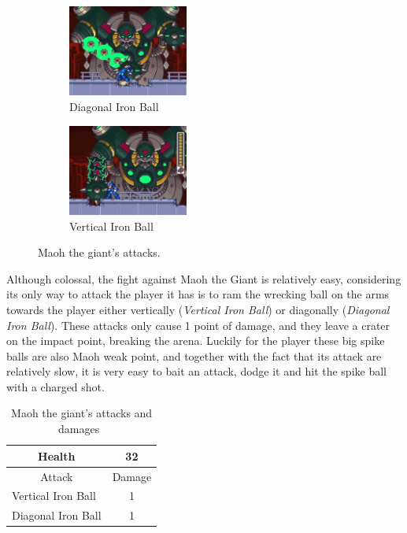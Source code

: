\begin{figure}[htp]
\centering
\begin{subfigure}{0.4\linewidth}
	\centering
	\includegraphics[height=3cm]{figures/X3/Diagonal_Ball.jpg}
	\caption{Diagonal Iron Ball}
\end{subfigure}
\begin{subfigure}{0.4\linewidth}
	\centering
	\includegraphics[height=3cm]{figures/X3/Vertiacal_Ball.jpg}
	\caption{Vertical Iron Ball}
\end{subfigure}
\caption{Maoh the giant's attacks.}
\end{figure}
Although colossal, the fight against Maoh the Giant is relatively easy, considering its only way to attack the player it has is to ram the wrecking ball on the arms towards the player either vertically (\emph{Vertical Iron Ball}) or diagonally (\emph{Diagonal Iron Ball}). These  attacks only cause 1 point of damage, and they leave a crater on the impact point, breaking the arena. Luckily for the player these big spike balls are also Maoh weak point, and together with the fact that its attack are relatively slow, it is very easy to bait an attack, dodge it and hit the spike ball with a charged shot.
\begin{table}[htp]
	\centering
	\begin{tabular}[h]{l c}
		\toprule
		\multicolumn{1}{c}{Health}  & 32\\
		\midrule
		\multicolumn{1}{c}{Attack} & \multicolumn{1}{c}{Damage}\\
		Vertical Iron Ball & 1 \\
		Diagonal Iron Ball & 1\\
		\bottomrule
	\end{tabular}
	\caption{Maoh the giant's attacks and damages~\cite{book:Compendium,wiki:Maoh}}
\end{table}

